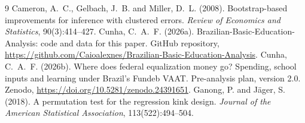 \documentclass[11pt]{article}
\begin{document}
\begin{thebibliography}{9}
 Cameron, A.~C., Gelbach, J.~B. and Miller, D.~L. (2008). Bootstrap-based improvements for inference with clustered errors. \textit{Review of Economics and Statistics}, 90(3):414--427.
 Cunha, C.~A.~F. (2026a). Brazilian-Basic-Education-Analysis: code and data for this paper. GitHub repository, \url{https://github.com/Caioalexnes/Brazilian-Basic-Education-Analysis}.
 Cunha, C.~A.~F. (2026b). Where does federal equalization money go? Spending, school inputs and learning under Brazil's Fundeb VAAT. Pre-analysis plan, version 2.0. Zenodo, \url{https://doi.org/10.5281/zenodo.24391651}.
 Ganong, P. and J\"ager, S. (2018). A permutation test for the regression kink design. \textit{Journal of the American Statistical Association}, 113(522):494--504.
\end{thebibliography}
\end{document}
